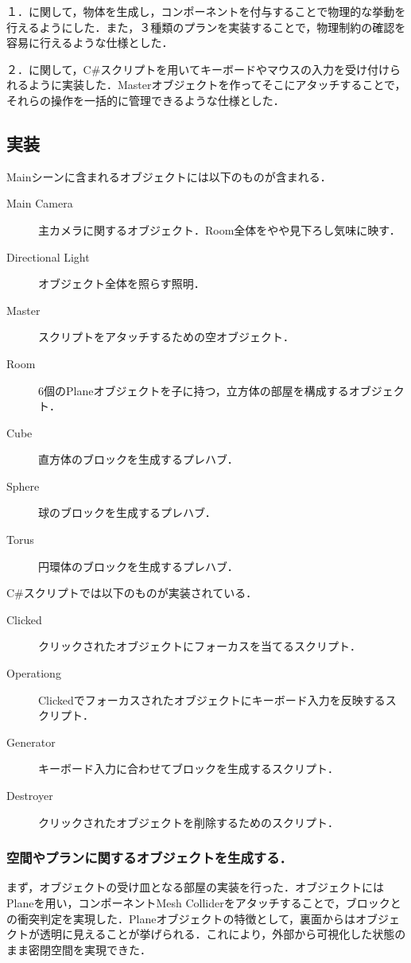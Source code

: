 \documentclass[uplatex,12pt]{jsarticle}
\begin{document}
１．に関して，物体を生成し，コンポーネントを付与することで物理的な挙動を行えるようにした．また，３種類のプランを実装することで，物理制約の確認を容易に行えるような仕様とした．

２．に関して，C\#スクリプトを用いてキーボードやマウスの入力を受け付けられるように実装した．Masterオブジェクトを作ってそこにアタッチすることで，それらの操作を一括的に管理できるような仕様とした．

\subsection{実装}
Mainシーンに含まれるオブジェクトには以下のものが含まれる．
\begin{description}
\item[Main Camera] 主カメラに関するオブジェクト．Room全体をやや見下ろし気味に映す．
\item[Directional Light] オブジェクト全体を照らす照明．
\item[Master] スクリプトをアタッチするための空オブジェクト．
\item[Room] 6個のPlaneオブジェクトを子に持つ，立方体の部屋を構成するオブジェクト．
\item[Cube] 直方体のブロックを生成するプレハブ．
\item[Sphere] 球のブロックを生成するプレハブ．
\item[Torus] 円環体のブロックを生成するプレハブ．
\end{description} 

C\#スクリプトでは以下のものが実装されている．
\begin{description}
\item[Clicked] クリックされたオブジェクトにフォーカスを当てるスクリプト．
\item[Operationg] Clickedでフォーカスされたオブジェクトにキーボード入力を反映するスクリプト．
\item[Generator] キーボード入力に合わせてブロックを生成するスクリプト．
\item[Destroyer] クリックされたオブジェクトを削除するためのスクリプト．
\end{description}

\subsubsection{空間やプランに関するオブジェクトを生成する．}
まず，オブジェクトの受け皿となる部屋の実装を行った．オブジェクトにはPlaneを用い，コンポーネントMesh Colliderをアタッチすることで，ブロックとの衝突判定を実現した．Planeオブジェクトの特徴として，裏面からはオブジェクトが透明に見えることが挙げられる．これにより，外部から可視化した状態のまま密閉空間を実現できた．
\end{document}
